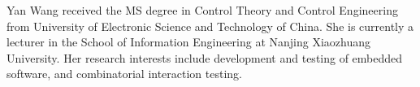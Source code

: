 \documentclass[journal,12pt,onecolumn,draftclsnofoot,]{IEEEtran}
\begin{document}
\begin{IEEEbiography}{Yan Wang}
received the MS degree in Control Theory and Control Engineering from University of Electronic Science and Technology of China. She is currently a lecturer in the School of Information Engineering at Nanjing Xiaozhuang University. Her research interests include development and testing of embedded software, and combinatorial interaction testing.
\end{IEEEbiography}






\end{document}
